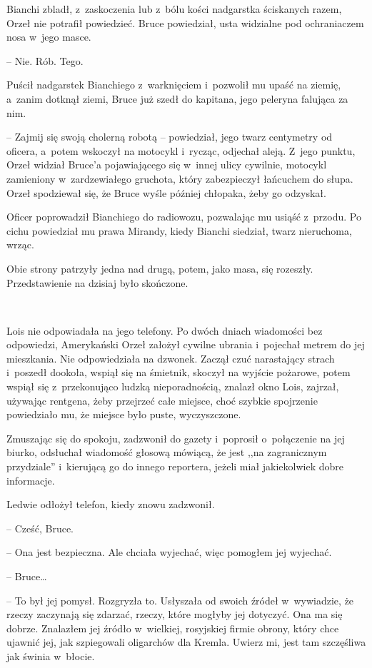 \documentclass[oneside,polish,11pt,sfheadings]{mwbk}
\begin{document}
Bianchi zbladł, z~zaskoczenia lub z~bólu kości nadgarstka ściskanych
razem, Orzeł nie potrafił powiedzieć. Bruce powiedział, usta widzialne
pod ochraniaczem nosa w~jego masce.

-- Nie. Rób. Tego.

Puścił nadgarstek Bianchiego z~warknięciem i~pozwolił mu upaść na
ziemię, a~zanim dotknął ziemi, Bruce już szedł do kapitana, jego
peleryna falująca za nim. 

-- Zajmij się swoją cholerną robotą -- powiedział, jego twarz centymetry od oficera, a~potem wskoczył na
motocykl i~rycząc, odjechał aleją. Z~jego punktu, Orzeł widział Bruce'a
pojawiającego się w~innej ulicy cywilnie, motocykl zamieniony w~zardzewiałego gruchota, który zabezpieczył łańcuchem do słupa. Orzeł
spodziewał się, że Bruce wyśle później chłopaka, żeby go odzyskał.

Oficer poprowadził Bianchiego do radiowozu, pozwalając mu usiąść z~przodu. Po cichu powiedział mu prawa Mirandy, kiedy Bianchi siedział,
twarz nieruchoma, wrząc.

Obie strony patrzyły jedna nad drugą, potem, jako masa, się rozeszły.
Przedstawienie na dzisiaj było skończone.

~

Lois nie odpowiadała na jego telefony. Po dwóch dniach wiadomości bez
odpowiedzi, Amerykański Orzeł założył cywilne ubrania i~pojechał metrem
do jej mieszkania. Nie odpowiedziała na dzwonek. Zaczął czuć narastający
strach i~poszedł dookoła, wspiął się na śmietnik, skoczył na wyjście
pożarowe, potem wspiął się z~przekonująco ludzką nieporadnością, znalazł
okno Lois, zajrzał, używając rentgena, żeby przejrzeć całe miejsce, choć
szybkie spojrzenie powiedziało mu, że miejsce było puste, wyczyszczone.

Zmuszając się do spokoju, zadzwonił do gazety i~poprosił o~połączenie na
jej biurko, odsłuchał wiadomość głosową mówiącą, że jest ,,na
zagranicznym przydziale'' i~kierującą go do innego reportera, jeżeli
miał jakiekolwiek dobre informacje.

Ledwie odłożył telefon, kiedy znowu zadzwonił.

-- Cześć, Bruce.

-- Ona jest bezpieczna. Ale chciała wyjechać, więc pomogłem jej wyjechać.

-- Bruce\ldots 

-- To był jej pomysł. Rozgryzła to. Usłyszała od swoich źródeł w~wywiadzie, że rzeczy zaczynają się zdarzać, rzeczy, które mogłyby jej
dotyczyć. Ona ma się dobrze. Znalazłem jej źródło w~wielkiej, rosyjskiej
firmie obrony, który chce ujawnić jej, jak szpiegowali oligarchów dla
Kremla. Uwierz mi, jest tam szczęśliwa jak świnia w~błocie.
\end{document}
